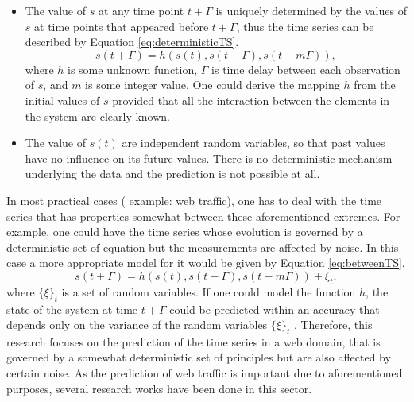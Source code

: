       \begin{itemize}
           \item The value of $s$ at any time point $t+\Gamma$ is uniquely determined by the values of $s$ at time points that appeared before $t+\Gamma$, thus the time series can be described by Equation \eqref{eq:deterministicTS}.
           \begin{equation}\label{eq:deterministicTS}
               s(t+\Gamma) = h(s(t), s(t-\Gamma), s(t-m\Gamma)),
           \end{equation}
           where $h$ is some unknown function, $\Gamma$ is time delay between each observation of $s$, and $m$ is some integer value. One could derive the mapping $h$ from the initial values of $s$ provided that all the interaction between the elements in the system are clearly known.
           \item The value of $s(t)$ are independent random variables, so that past values have no influence on its future values. There is no deterministic mechanism underlying the data and the prediction is not possible at all.
       \end{itemize}
       In most practical cases ( example: web traffic), one has to deal with the time series that has properties somewhat between  these aforementioned extremes. For example, one could have the time series whose evolution is governed by a deterministic set of equation but the measurements are affected by noise. In this case a more appropriate model for it would be given by Equation \eqref{eq:betweenTS}.
       \begin{equation}\label{eq:betweenTS}
           s(t+\Gamma) = h(s(t), s(t-\Gamma), s(t-m\Gamma)) + \xi_t,
       \end{equation}
       where $\{ \xi \}_t$ is a set of random variables. If one could model the function $h$, the state of the system at time $t+\Gamma$ could be predicted within an accuracy that depends only on the variance of the random variables  $\{ \xi \}_t$ \cite{wpUsingANN}.
       Therefore, this research focuses on the prediction of the time series in a web domain, that is governed by a somewhat deterministic set of principles but are also affected by certain noise.
  	 As the prediction of web traffic is important due to aforementioned purposes, several research works have been done in this sector.\\
  
